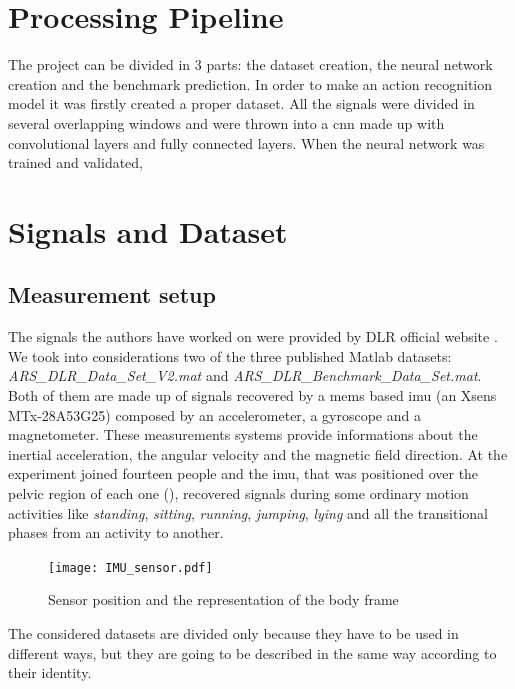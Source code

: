 
\section{Processing Pipeline}
\label{sec:processing_architecture}
The project can be divided in 3 parts: the dataset creation, the neural network creation and the benchmark prediction.
In order to make an action recognition model it was firstly created a proper dataset. All the signals were divided in several overlapping windows and were thrown into a \gls{cnn} made up with convolutional layers and fully connected layers.
When the neural network was trained and validated, 


\section{Signals and Dataset}
\label{sec:model}

\subsection{Measurement setup}
The signals the authors have worked on were provided by DLR official website \cite{DLR}. We took into considerations two of the three published Matlab datasets: \textit{ARS\_DLR\_Data\_Set\_V2.mat} and \textit{ARS\_DLR\_Benchmark\_Data\_Set.mat}. 
Both of them are made up of signals recovered by a \gls{mems} based \gls{imu} (an Xsens MTx-28A53G25) composed by an accelerometer, a gyroscope and a magnetometer. These measurements systems provide informations about the inertial acceleration, the angular velocity and the magnetic field direction.
At the experiment joined fourteen people and the \gls{imu}, that was positioned over the pelvic region of each one (), recovered signals during some ordinary motion activities like \textit{standing}, \textit{sitting}, \textit{running}, \textit{jumping}, \textit{lying} and all the transitional phases from an activity to another.

\begin{figure}[htp]
\texttt{[image: IMU\_sensor.pdf]}
\caption{Sensor position and the representation of the body frame}
\label{fig:IMU}
\end{figure}

The considered datasets are divided only because they have to be used in different ways, but they are going to be described in the same way according to their identity.

